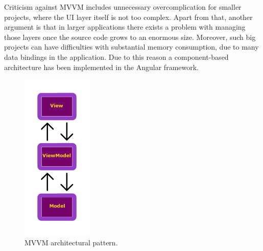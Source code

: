 \documentclass{article} %
\begin{document}
\newline
Criticism against MVVM includes unnecessary overcomplication for smaller projects, where the UI layer itself is not too complex. Apart from that, another argument is that in larger applications there exists a problem with managing those layers once the source code grows to an enormous size. Moreover, such big projects can have difficulties with substantial memory consumption, due to many data bindings in the application. Due to this reason a component-based architecture has been implemented in the Angular framework.
\begin{figure}[ht]
  \centering
      \includegraphics[width=0.3\textwidth]{mvvm.png}
  \caption{MVVM architectural pattern.}
  \label{fig:mvvm}
\end{figure}
\end{document}
